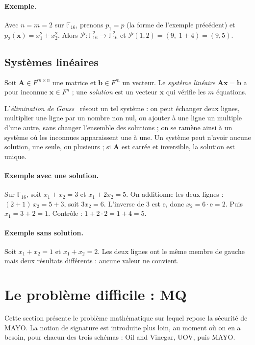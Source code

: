 \paragraph{Exemple.} Avec $n=m=2$ sur $\mathbb{F}_{16}$, prenons $p_1=p$ (la forme de l'exemple précédent) et $p_2(\mathbf{x})=x_1^2+x_2^2$. Alors $\mathcal{P}:\mathbb{F}_{16}^2\to\mathbb{F}_{16}^2$ et $\mathcal{P}(1,2)=(9,\;1+4)=(9,5)$.

\subsection{Systèmes linéaires}\label{sec:math-lin}
\begin{definition}
Soit $\mathbf{A}\in F^{m\times n}$ une matrice et $\mathbf{b}\in F^m$ un vecteur. Le \emph{système linéaire} $\mathbf{A}\mathbf{x}=\mathbf{b}$ a pour inconnue $\mathbf{x}\in F^n$ ; une \emph{solution} est un vecteur $\mathbf{x}$ qui vérifie les $m$ équations.
\end{definition}
L'\emph{élimination de Gauss}~\cite{horn} résout un tel système : on peut échanger deux lignes, multiplier une ligne par un nombre non nul, ou ajouter à une ligne un multiple d'une autre, sans changer l'ensemble des solutions ; on se ramène ainsi à un système où les inconnues apparaissent une à une. Un système peut n'avoir aucune solution, une seule, ou plusieurs ; si $\mathbf{A}$ est carrée et inversible, la solution est unique.

\paragraph{Exemple avec une solution.} Sur $\mathbb{F}_{16}$, soit $x_1+x_2=3$ et $x_1+2x_2=5$. On additionne les deux lignes : $(2+1)\,x_2=5+3$, soit $3x_2=6$. L'inverse de $3$ est $\mathrm{e}$, donc $x_2=6\cdot\mathrm{e}=2$. Puis $x_1=3+2=1$. Contrôle : $1+2\cdot2=1+4=5$.

\paragraph{Exemple sans solution.} Soit $x_1+x_2=1$ et $x_1+x_2=2$. Les deux lignes ont le même membre de gauche mais deux résultats différents : aucune valeur ne convient.

\section{Le problème difficile : MQ}\label{sec:signature}
Cette section présente le problème mathématique sur lequel repose la sécurité de MAYO. La notion de signature est introduite plus loin, au moment où on en a besoin, pour chacun des trois schémas : Oil and Vinegar, UOV, puis MAYO.

